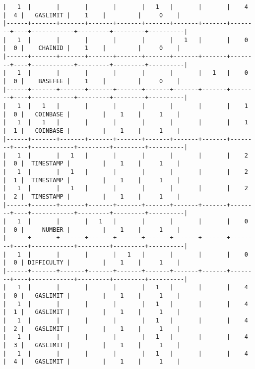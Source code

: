\documentclass[varwidth=\maxdimen,margin=0.5cm,multi={verbatim}]{standalone}
\begin{document}
\begin{verbatim}
|   1  |       |       |       |       |   1   |       |       |    4   |  4 |   GASLIMIT |    1    |         |     0    |
|------+-------+-------+-------+-------+-------+-------+-------+--------+----+------------+---------+---------+----------|
|   1  |       |       |       |       |       |   1   |       |    0   |  0 |    CHAINID |    1    |         |     0    |
|------+-------+-------+-------+-------+-------+-------+-------+--------+----+------------+---------+---------+----------|
|   1  |       |       |       |       |       |       |   1   |    0   |  0 |    BASEFEE |    1    |         |     0    |
|------+-------+-------+-------+-------+-------+-------+-------+--------+----+------------+---------+---------+----------|
|   1  |   1   |       |       |       |       |       |       |    1   |  0 |   COINBASE |         |    1    |     1    |
|   1  |   1   |       |       |       |       |       |       |    1   |  1 |   COINBASE |         |    1    |     1    |
|------+-------+-------+-------+-------+-------+-------+-------+--------+----+------------+---------+---------+----------|
|   1  |       |   1   |       |       |       |       |       |    2   |  0 |  TIMESTAMP |         |    1    |     1    |
|   1  |       |   1   |       |       |       |       |       |    2   |  1 |  TIMESTAMP |         |    1    |     1    |
|   1  |       |   1   |       |       |       |       |       |    2   |  2 |  TIMESTAMP |         |    1    |     1    |
|------+-------+-------+-------+-------+-------+-------+-------+--------+----+------------+---------+---------+----------|
|   1  |       |       |   1   |       |       |       |       |    0   |  0 |     NUMBER |         |    1    |     1    |
|------+-------+-------+-------+-------+-------+-------+-------+--------+----+------------+---------+---------+----------|
|   1  |       |       |       |   1   |       |       |       |    0   |  0 | DIFFICULTY |         |    1    |     1    |
|------+-------+-------+-------+-------+-------+-------+-------+--------+----+------------+---------+---------+----------|
|   1  |       |       |       |       |   1   |       |       |    4   |  0 |   GASLIMIT |         |    1    |     1    |
|   1  |       |       |       |       |   1   |       |       |    4   |  1 |   GASLIMIT |         |    1    |     1    |
|   1  |       |       |       |       |   1   |       |       |    4   |  2 |   GASLIMIT |         |    1    |     1    |
|   1  |       |       |       |       |   1   |       |       |    4   |  3 |   GASLIMIT |         |    1    |     1    |
|   1  |       |       |       |       |   1   |       |       |    4   |  4 |   GASLIMIT |         |    1    |     1    |

\end{verbatim}
\end{document}
